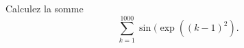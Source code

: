 \begin{exercice}\label{exoMatlab0039}

Calculez la somme
\[ \sum_{k=1}^{1000} \sin(\exp((k-1)^2) . \]

\end{exercice}
